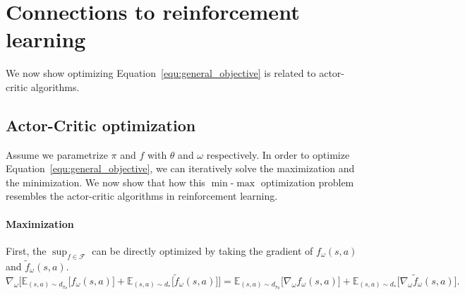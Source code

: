 \section{Connections to reinforcement learning}
We now show optimizing Equation~\ref{equ:general_objective} is related to actor-critic algorithms.

\subsection{Actor-Critic optimization}
Assume we parametrize $\pi$ and $f$ with $\theta$ and $\omega$ respectively. 
In order to optimize Equation~\ref{equ:general_objective}, we can iteratively solve the maximization and the minimization. 
We now show that how this $\min$-$\max$ optimization problem resembles the actor-critic algorithms in reinforcement learning. 

\paragraph{Maximization} First, the $\sup_{f\in\mathcal{F}}$ can be directly optimized by taking the gradient of $f_{\omega}(s, a)$ and $\tilde{f}_{\omega}(s, a)$. 
\begin{equation*}
\nabla_{\omega} \Big[ \mathbb{E}_{(s, a)\sim d_{\pi_{\theta}}} \big[ f_{\omega}(s, a) \big] + \mathbb{E}_{(s, a)\sim d_*} \big[ \tilde{f}_{\omega}(s, a) \big] \Big]
= \mathbb{E}_{(s, a)\sim d_{\pi_{\theta}}} \big[ \nabla_{\omega} f_{\omega}(s, a) \big] + \mathbb{E}_{(s, a)\sim d_*} \big[ \nabla_{\omega} \tilde{f}_{\omega}(s, a) \big].
\end{equation*}

